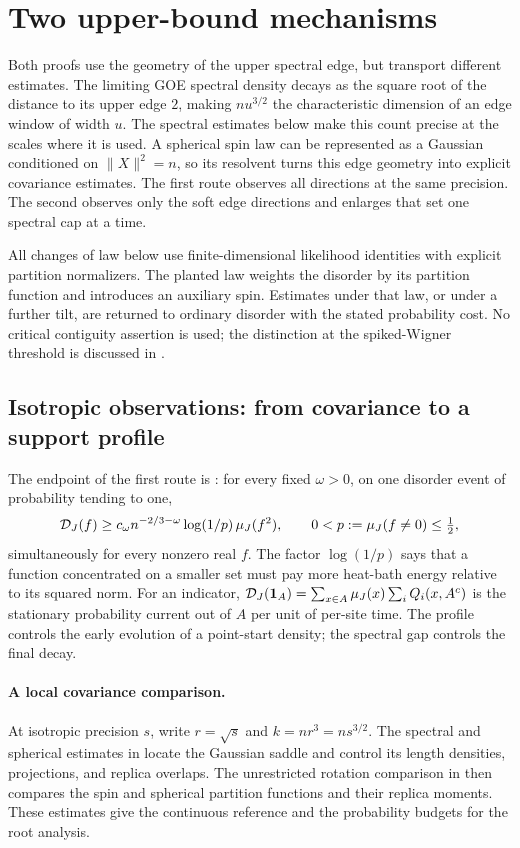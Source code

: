 \section{Two upper-bound mechanisms}\label{sec:proof-overview}

Both proofs use the geometry of the upper spectral edge, but transport
different estimates. The limiting GOE spectral density decays as the
square root of the distance to its upper edge $2$, making $nu^{3/2}$ the
characteristic dimension of an edge window of width $u$. The spectral
estimates below make this count precise at the scales where it is used.
A spherical spin law can be represented as a
Gaussian conditioned on $\|X\|^2=n$, so its resolvent turns this edge
geometry into explicit covariance estimates. The first route observes
all directions at the same precision. The second observes only the soft
edge directions and enlarges that set one spectral cap at a time.

All changes of law below use finite-dimensional likelihood identities
with explicit partition normalizers. The planted law weights the disorder
by its partition function and introduces an auxiliary spin. Estimates
under that law, or under a further tilt, are returned to ordinary disorder
with the stated probability cost. No critical contiguity assertion is
used; the distinction at the spiked-Wigner threshold is discussed in
\cite[Appendix~A]{PerryWeinBandeiraMoitra2018}.

\subsection{Isotropic observations: from covariance to a support profile}

The endpoint of the first route is : for every
fixed $\omega>0$, on one disorder event of probability tending to one,
\[
 \mathcal D_J(f)\ge c_\omega n^{-2/3-\omega}\log(1/p)\,\mu_J(f^2),
 \qquad 0<p:=\mu_J(f\ne0)\le\tfrac12,
\]
simultaneously for every nonzero real $f$. The factor $\log(1/p)$ says
that a function concentrated on a smaller set must pay more heat-bath
energy relative to its squared norm. For an indicator,
$\mathcal D_J(\mathbf1_A)=\sum_{x\in A}\mu_J(x)\sum_iQ_i(x,A^c)$ is the
stationary probability current out of $A$ per unit of per-site time.
The profile controls the early evolution of a point-start density;
the spectral gap controls the final decay.

\paragraph{A local covariance comparison.}
At isotropic precision $s$, write $r=\sqrt s$ and $k=nr^3=ns^{3/2}$.
The spectral and spherical estimates in  locate
the Gaussian saddle and control its length densities, projections, and
replica overlaps. The unrestricted rotation comparison in
 then compares the spin and spherical
partition functions and their replica moments. These estimates give the
continuous reference and the probability budgets for the root analysis.

